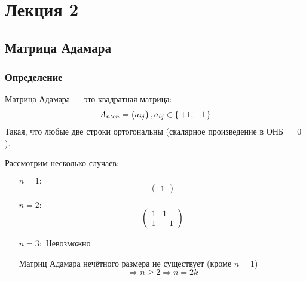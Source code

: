 \section{Лекция 2}
\subsection{Матрица Адамара}
\subsubsection{Определение}
\begin{definition}
  Матрица Адамара --- это квадратная матрица:
\[
  A_{n \times n} = \begin{pmatrix} a_{ij}\end{pmatrix}, a_{ij} \in \set{+1, -1}
\]
Такая, что любые две строки ортогональны (скалярное произведение в ОНБ $= 0$).
\end{definition}
Рассмотрим несколько случаев:
\begin{itemize}
  \item [$n = 1:$] \[
  \begin{pmatrix} 1 \end{pmatrix}
  \]
\item [$n = 2:$] \[
    \begin{pmatrix} 1 & 1 \\ 1 & -1 \end{pmatrix}
\]
\item [$n = 3:$] Невозможно
  \begin{note}
    Матриц Адамара нечётного размера не существует (кроме $n = 1$)
  \[
  \Rightarrow n \geq 2 \Rightarrow n = 2k
  \]
  \end{note}
\end{itemize}
